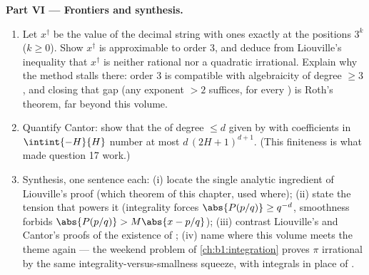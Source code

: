 \begin{problem}
\medskip
\noindent\textbf{Part VI --- Frontiers and synthesis.}
\begin{enumerate}[resume]
  \item Let $x^\dagger$ be the value of the decimal string with
        ones exactly at the positions $3^k$ ($k \geq 0$). Show
        $x^\dagger$ is approximable to order $3$, and deduce
        from Liouville's inequality that $x^\dagger$ is neither
        rational nor a quadratic irrational. Explain why the
        method stalls there: order $3$ is compatible with
        algebraicity of degree $\geq 3$, and closing that gap
        (any exponent $> 2$ suffices, for every ) is Roth's theorem, far beyond this volume.
  \item Quantify Cantor: show that the  of
        degree $\leq d$ given by  with coefficients
        in $\intint{-H}{H}$ number at most $d\,(2H + 1)^{d+1}$.
        (This finiteness is what made question 17 work.)
  \item Synthesis, one sentence each: (i) locate the single
        analytic ingredient of Liouville's proof (which theorem
        of this chapter, used where); (ii) state the tension
        that powers it (integrality forces $\abs{P(p/q)} \geq
        q^{-d}$, smoothness forbids $\abs{P(p/q)} > M\abs{x -
        p/q}$); (iii) contrast Liouville's and Cantor's proofs
        of the existence of ; (iv) name
        where this volume meets the theme again --- the weekend
        problem of \cref{ch:b1:integration} proves $\pi$
        irrational by the same integrality-versus-smallness
        squeeze, with integrals in place of .
\end{enumerate}
\end{problem}
